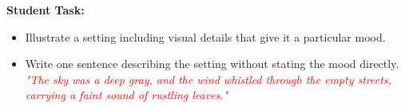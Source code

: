 \documentclass[12pt]{article}
\begin{document}
\vspace{1em}

\begin{tcolorbox}[colframe=black!60, colback=white, 
coltitle=black, colbacktitle=black!15, fonttitle=\bfseries\Large, 
title=Exit Ticket, halign title=center, left=10pt, right=10pt, bottom=15pt]

\textbf{Student Task:}
\begin{itemize}
    \item Illustrate a setting including visual details that give it a particular mood.
    \item Write one sentence describing the setting without stating the mood directly.  
    \textcolor{red}{\textit{"The sky was a deep gray, and the wind whistled through the empty streets, carrying a faint sound of rustling leaves."}}
\end{itemize}

\end{tcolorbox}
\end{document}
